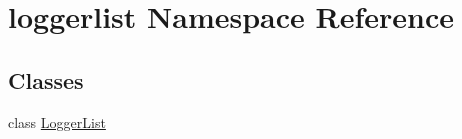 \hypertarget{namespaceloggerlist}{}\section{loggerlist Namespace Reference}
\label{namespaceloggerlist}
\subsection*{Classes}
\begin{DoxyCompactItemize}
\item 
class \mbox{\hyperlink{classloggerlist_1_1_logger_list}{Logger\+List}}
\end{DoxyCompactItemize}
